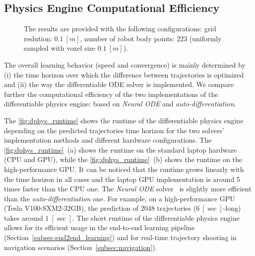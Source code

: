 \subsection{Physics Engine Computational Efficiency}\label{subsec:computational_efficiency}
\begin{figure}
    \centering

    \caption{The results are provided with the following configurations:
    grid reslution: $0.1~[m]$, number of robot body points: $223$ (uniformly sampled with voxel size $0.1~[m]$).}
    \label{fig:dphys_runtime}
\end{figure}
The overall learning behavior (speed and convergence) is mainly determined by
(i) the time horizon over which the difference between trajectories is optimized and
(ii) the way the differentiable ODE solver is implemented.
We compare further the computational efficiency of the two implementations
of the differentiable physics engine: based on \textit{Neural ODE} and \textit{auto-differentiation}.

The \autoref{fig:dphys_runtime} shows the runtime of the differentiable physics engine depending on
the predicted trajectories time horizon for the two solvers' implementation methods and different hardware configurations.
The \autoref{fig:dphys_runtime}~(a) shows the runtime on the standard laptop hardware (CPU and GPU),
while the \autoref{fig:dphys_runtime}~(b) shows the runtime on the high-performance GPU.
It can be noticed that the runtime grows linearly with the time horizon in all cases and
the laptop GPU implementation is around 5 times faster than the CPU one.
The \textit{Neural ODE} solver~\cite{neural-ode-2021} is slightly more efficient than the \textit{auto-differentiation} one.
For example, on a high-performance GPU (Tesla V100-SXM2-32GB), the prediction of
2048 trajectories ($6~[\si{\sec}]$-long) takes around $1~[\si{\sec}]$.
The short runtime of the differentiable physics engine allows for its
efficient usage in the end-to-end learning pipeline (Section~\ref{subsec:end2end_learning}) and for real-time
trajectory shooting in navigation scenarios (Section~\ref{subsec:navigation}).

